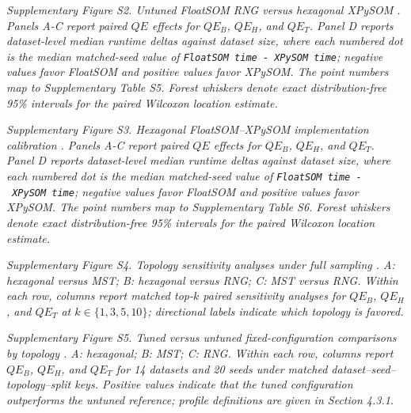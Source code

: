 \documentclass[
]{article}
\makeatletter
\newcommand*\pandocbounded[1]{%
  \sbox\pandoc@box{#1}%
  \Gscale@div\@tempa{\textheight}{\dimexpr\ht\pandoc@box+\dp\pandoc@box\relax}%
  \Gscale@div\@tempb{\linewidth}{\wd\pandoc@box}%
  \ifdim\@tempb\p@<\@tempa\p@\let\@tempa\@tempb\fi%
  \ifdim\@tempa\p@<\p@\scalebox{\@tempa}{\usebox\pandoc@box}%
  \else\usebox{\pandoc@box}%
  \fi%
}
\providecommand{\DIFadd}[1]{{\protect\color{blue} #1}} %
\providecommand{\DIFaddbegin}{} %
\providecommand{\DIFaddend}{} %
\makeatother
\begin{document}
\pandocbounded{}
\emph{Supplementary Figure S2. \DIFaddbegin \DIFadd{Untuned }\DIFaddend FloatSOM \DIFaddbegin \DIFadd{RNG }\DIFaddend versus \DIFaddbegin \DIFadd{hexagonal
}\DIFaddend XPySOM . Panels A-C report paired \(QE\) effects for \(QE_B\), \(QE_H\),
and \(QE_T\). Panel D reports dataset-level median runtime deltas
against dataset size, where each numbered dot is the median matched-seed
value of \texttt{FloatSOM\ time\ -\ XPySOM\ time}; negative values favor
FloatSOM and positive values favor XPySOM. The point numbers map to
Supplementary Table S5. Forest whiskers denote \DIFaddbegin \DIFadd{exact distribution-free
}\DIFaddend 95\%  intervals  \DIFaddbegin \DIFadd{for }\DIFaddend the  paired  \DIFaddbegin \DIFadd{Wilcoxon location estimate}\DIFaddend .}

\pandocbounded{}
\emph{Supplementary Figure S3.  \DIFaddbegin \DIFadd{Hexagonal FloatSOM--XPySOM implementation
}\DIFaddend calibration . Panels A-C report paired \(QE\) effects for \(QE_B\),
\(QE_H\), and \(QE_T\). Panel D reports dataset-level median runtime
deltas against dataset size, where each numbered dot is the median
matched-seed value of \texttt{FloatSOM\ time\ -\ XPySOM\ time}; negative
values favor FloatSOM and positive values favor XPySOM. The point
numbers map to Supplementary Table S6. Forest whiskers denote \DIFaddbegin \DIFadd{exact
distribution-free }\DIFaddend 95\%  intervals  \DIFaddbegin \DIFadd{for }\DIFaddend the  paired  \DIFaddbegin \DIFadd{Wilcoxon location
estimate}\DIFaddend .}

\pandocbounded{}
\emph{Supplementary Figure S4.  \DIFaddbegin \DIFadd{Topology sensitivity analyses }\DIFaddend under full
sampling .  \DIFaddbegin \DIFadd{A: hexagonal versus MST; B: hexagonal versus RNG; C: MST
versus RNG. Within each row, columns }\DIFaddend report \DIFaddbegin \DIFadd{matched top-\(k\) }\DIFaddend paired
 \DIFaddbegin \DIFadd{sensitivity analyses }\DIFaddend for \(QE_B\), \(QE_H\), and \(QE_T\)  \DIFaddbegin \DIFadd{at
\(k\in\{1,3,5,10\}\); directional labels indicate which topology is
favored}\DIFaddend . }

\pandocbounded{}
\emph{Supplementary Figure S5.  \DIFaddbegin \DIFadd{Tuned }\DIFaddend versus  \DIFaddbegin \DIFadd{untuned fixed-configuration
comparisons by }\DIFaddend topology .  \DIFaddbegin \DIFadd{A: hexagonal; B: MST; C: RNG. Within each row,
columns }\DIFaddend report  \(QE_B\), \(QE_H\), and \(QE_T\) \DIFaddbegin \DIFadd{for 14 datasets and 20
seeds under matched dataset--seed--topology--split keys}\DIFaddend . \DIFaddbegin \DIFadd{Positive values
indicate that the tuned configuration outperforms the untuned reference;
profile definitions are given in Section 4.3.1.}\DIFaddend }
\end{document}
